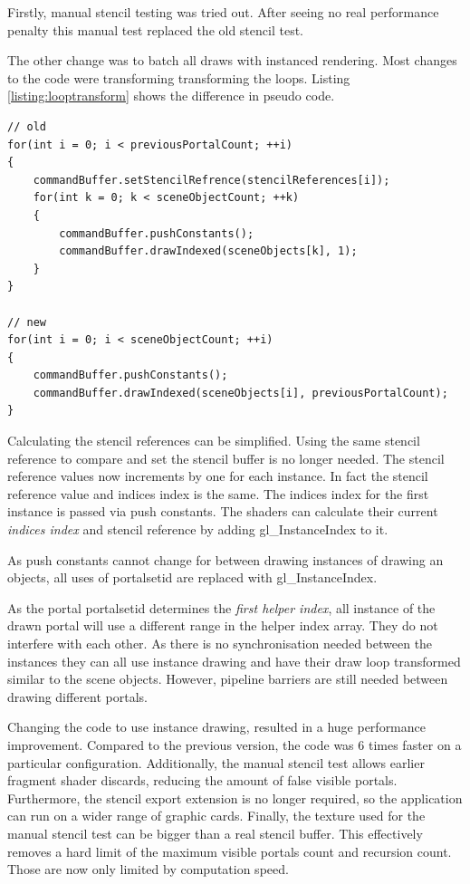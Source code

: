 Firstly, manual stencil testing was tried out. After seeing no real performance penalty this manual test replaced the old stencil test.

The other change was to batch all draws with instanced rendering. Most changes to the code were transforming transforming the loops. Listing \ref{listing:looptransform} shows the difference in pseudo code.

\begin{lstlisting}[caption={Pseudocode Loop Transformation}, label=listing:looptransform]
// old 
for(int i = 0; i < previousPortalCount; ++i)
{
	commandBuffer.setStencilRefrence(stencilReferences[i]);
	for(int k = 0; k < sceneObjectCount; ++k)
	{
		commandBuffer.pushConstants();
		commandBuffer.drawIndexed(sceneObjects[k], 1);
	}
}

// new
for(int i = 0; i < sceneObjectCount; ++i)
{
	commandBuffer.pushConstants();
	commandBuffer.drawIndexed(sceneObjects[i], previousPortalCount);
}
\end{lstlisting}


Calculating the stencil references can be simplified. Using the same stencil reference to compare and set the stencil buffer is no longer needed. The stencil reference values now increments by one for each instance. In fact the stencil reference value and indices index is the same. The indices index for the first instance is passed via push constants. The shaders can calculate their current \textit{indices index} and stencil reference by adding gl\_InstanceIndex to it.

As push constants cannot change for between drawing instances of drawing an objects, all uses of  \gls{portalsetid} are replaced with gl\_InstanceIndex.

As the portal \gls{portalsetid} determines the \textit{first helper index}, all instance of the drawn portal will use a different range in the helper index array. They do not interfere with each other. As there is no synchronisation needed between the instances they can all use instance drawing and have their draw loop transformed similar to the scene objects. However, pipeline barriers are still needed between drawing different portals.

Changing the code to use instance drawing, resulted in a huge performance improvement. Compared to the previous version, the code was 6 times faster on a particular configuration. Additionally, the manual stencil test allows earlier fragment shader discards, reducing the amount of false visible portals. Furthermore, the stencil export extension is no longer required, so the application can run on a wider range of graphic cards. Finally, the texture used for the manual stencil test can be bigger than a real stencil buffer. This effectively removes a hard limit of the maximum visible portals count and recursion count. Those are now only limited by computation speed.


